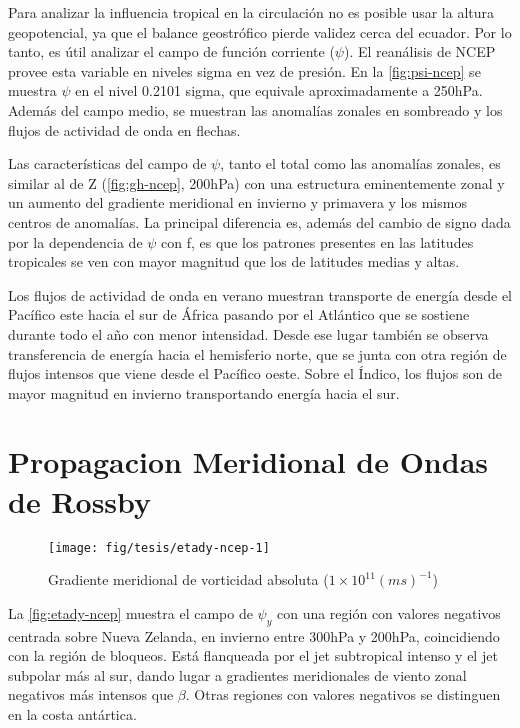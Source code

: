 \documentclass[spanish,a4paper,12p]{book}
\begin{document}
Para analizar la influencia tropical en la circulación no es posible
usar la altura geopotencial, ya que el balance geostrófico pierde
validez cerca del ecuador. Por lo tanto, es útil analizar el campo de
función corriente (\(\psi\)). El reanálisis de NCEP provee esta variable
en niveles sigma en vez de presión. En la \autoref{fig:psi-ncep} se
muestra \(\psi\) en el nivel 0.2101 sigma, que equivale aproximadamente
a 250hPa. Además del campo medio, se muestran las anomalías zonales en
sombreado y los flujos de actividad de onda en flechas.

Las características del campo de \(\psi\), tanto el total como las
anomalías zonales, es similar al de Z (\autoref{fig:gh-ncep}, 200hPa)
con una estructura eminentemente zonal y un aumento del gradiente
meridional en invierno y primavera y los mismos centros de anomalías. La
principal diferencia es, además del cambio de signo dada por la
dependencia de \(\psi\) con f, es que los patrones presentes en las
latitudes tropicales se ven con mayor magnitud que los de latitudes
medias y altas.

Los flujos de actividad de onda en verano muestran transporte de energía
desde el Pacífico este hacia el sur de África pasando por el Atlántico
que se sostiene durante todo el año con menor intensidad. Desde ese
lugar también se observa transferencia de energía hacia el hemisferio
norte, que se junta con otra región de flujos intensos que viene desde
el Pacífico oeste. Sobre el Índico, los flujos son de mayor magnitud en
invierno transportando energía hacia el sur.

\section{Propagacion Meridional de Ondas de
Rossby}\label{propagacion-meridional-de-ondas-de-rossby}

\begin{landscape}\begin{figure}

{\centering \texttt{[image: fig/tesis/etady-ncep-1]} 

}

\caption{Gradiente meridional de vorticidad absoluta ($1\times10^11(ms)^{-1}$)}\label{fig:etady-ncep}
\end{figure}
\end{landscape}

La \autoref{fig:etady-ncep} muestra el campo de \(\psi_y\) con una
región con valores negativos centrada sobre Nueva Zelanda, en invierno
entre 300hPa y 200hPa, coincidiendo con la región de bloqueos. Está
flanqueada por el jet subtropical intenso y el jet subpolar más al sur,
dando lugar a gradientes meridionales de viento zonal negativos más
intensos que \(\beta\). Otras regiones con valores negativos se
distinguen en la costa antártica.
\end{document}
